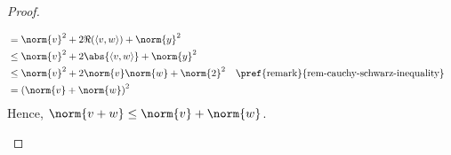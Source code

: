 \begin{proof}
\begin{flushleft}
\begin{enumerate}
\begin{align*}
				                   & = \norm{v}^2 + 2\Re(\left<v,w\right>) + \norm{y}^2                                                                                   \\
				                   & \leq \norm{v}^2 + 2\abs{\left<v,w\right>} + \norm{y}^2                                                                               \\
				                   & \leq \norm{v}^2 + 2\norm{v}\norm{w} + \norm{2}^2                            &  & \text{\pref{remark}{rem-cauchy-schwarz-inequality}} \\
				                   & =\left(\norm{v}+\norm{w}\right)^2
			      \end{align*}
			      Hence, $\norm{v+w}\leq\norm{v}+\norm{w}$.
		\end{enumerate}
	\end{flushleft}
\end{proof}
